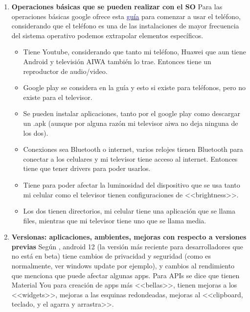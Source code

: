 \documentclass[stu, 12pt, letterpaper, donotrepeattitle, floatsintext, natbib, helv]{apa7}
\begin{document}
\begin{enumerate}
    \item \textbf{Operaciones básicas que se pueden realizar con el SO}
    Para las operaciones básicas google ofrece esta \href{https://www.google.com/url?sa=t&rct=j&q=&esrc=s&source=web&cd=&cad=rja&uact=8&ved=2ahUKEwi4wMPxm7H4AhVSDEQIHbPMDUYQFnoECAMQAQ&url=https%3A%2F%2Fwww.google.com%2Fhelp%2Fhc%2Fimages%2Fandroid%2Fandroid_ug_50%2FAndroid-Lollipop-Quick-Start-Guide.pdf&usg=AOvVaw21ccumKA5SleZksbFWmmBN}{\textcolor{blue}{guía}} para comenzar a usar el teléfono, considerando que el teléfono es una de las instalaciones de mayor frecuencia del sistema operativo podemos extrapolar elementos específicos.
    \begin{itemize}
        \item Tiene Youtube, considerando que tanto mi teléfono, Huawei que aun tiene Android y televisión AIWA también lo trae. Entonces tiene un reproductor de audio/video.
        \item Google play se considera en la guía y esto si existe para teléfonos, pero no existe para el televisor.
        \item Se pueden instalar aplicaciones, tanto por el google play como descargar un .apk (aunque por alguna razón mi televisor aiwa no deja ninguna de los dos).
        \item Conexiones sea Bluetooth o internet, varios relojes tienen Bluetooth para conectar a los celulares y mi televisor tiene acceso al internet. Entonces tiene que tener drivers para poder usarlos.
        \item Tiene para poder afectar la luminosidad del dispositivo que se usa tanto mi celular como el televisor tienen configuraciones de <<brightness>>.
        \item Los dos tienen directorios, mi celular tiene una aplicación que se llama files, mientras que mi televisor tiene uno que se llama media.
    \end{itemize}
    
    \item \textbf{Versionas: aplicaciones, ambientes, mejoras con respecto a versiones previas}
    Según \cite{androidVersions}, android 12 (la versión más reciente para desarrolladores que no está en beta) tiene cambios de privacidad y seguridad (como es normalmente, ver windows update por ejemplo), y cambios al rendimiento que menciona que puede afectar algunas apps. Para APIs se dice que tienen Material You para creación de apps más <<bellas>>, tienen mejoras a los <<widgets>>, mejoras a las esquinas redondeadas, mejoras al <<clipboard, teclado, y el agarra y arrastra>>.
    

\end{enumerate}
\end{document}
